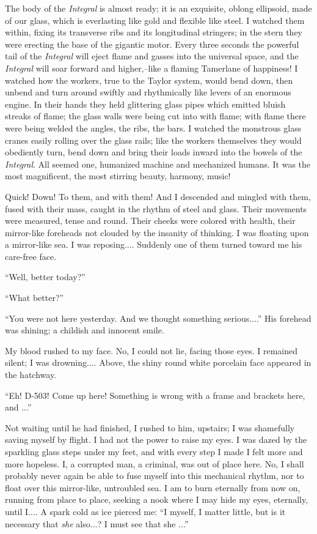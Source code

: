 \documentclass[11pt,openany]{book}
\begin{document}
The body of the \emph{Integral} is almost ready; it is an exquisite, oblong ellipsoid, made of our glass, which is everlasting like gold and flexible like steel. I watched them within, fixing its transverse ribs and its longitudinal stringers; in the stern they were erecting the base of the gigantic motor. Every three seconds the powerful tail of the \emph{Integral} will eject flame and gasses into the universal space, and the \emph{Integral} will soar forward and higher,--like a flaming Tamerlane of happiness! I watched how the workers, true to the Taylor system, would bend down, then unbend and turn around swiftly and rhythmically like levers of an enormous engine. In their hands they held glittering glass pipes which emitted bluish streaks of flame; the glass walls were being cut into with flame; with flame there were being welded the angles, the ribs, the bars. I watched the monstrous glass cranes easily rolling over the glass rails; like the workers themselves they would obediently turn, bend down and bring their loads inward into the bowels of the \emph{Integral}. All seemed one, humanized machine and mechanized humans. It was the most magnificent, the most stirring beauty, harmony, music!

Quick! Down! To them, and with them! And I descended and mingled with them, fused with their mass, caught in the rhythm of steel and glass. Their movements were measured, tense and round. Their cheeks were colored with health, their mirror-like foreheads not clouded by the insanity of thinking. I was floating upon a mirror-like sea. I was reposing.... Suddenly one of them turned toward me his care-free face.

``Well, better today?''

``What better?''

``You were not here yesterday. And we thought something serious....'' His forehead was shining; a childish and innocent smile.

My blood rushed to my face. No, I could not lie, facing those eyes. I remained silent; I was drowning.... Above, the shiny round white porcelain face appeared in the hatchway.

``Eh! D-503! Come up here! Something is wrong with a frame and brackets here, and ...''

Not waiting until he had finished, I rushed to him, upstairs; I was shamefully saving myself by flight. I had not the power to raise my eyes. I was dazed by the sparkling glass steps under my feet, and with every step I made I felt more and more hopeless. I, a corrupted man, a criminal, was out of place here. No, I shall probably never again be able to fuse myself into this mechanical rhythm, nor to float over this mirror-like, untroubled sea. I am to burn eternally from now on, running from place to place, seeking a nook where I may hide my eyes, eternally, until I.... A spark cold as ice pierced me: ``I myself, I matter little, but is it necessary that \emph{she} also...? I must see that she ...''
\end{document}
